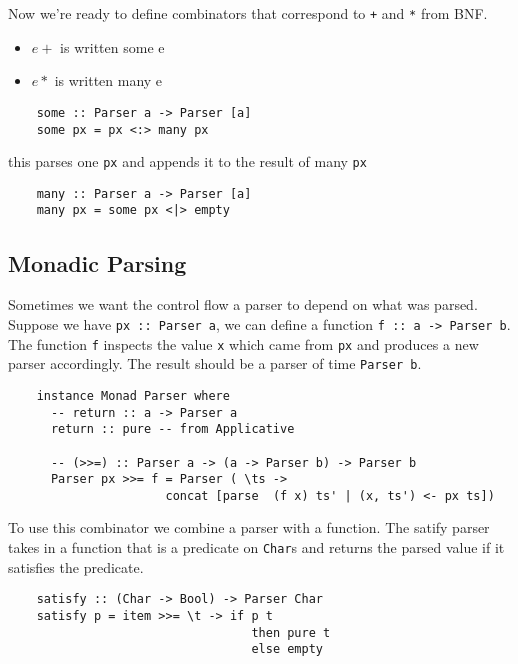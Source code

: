 \documentclass[a4paper,12pt]{article}
\theoremstyle{remark}
\begin{document}
Now we're ready to define combinators that correspond to \lstinline{+} and \lstinline{*} from BNF.
\begin{itemize}
  \item $e+$ is written some e
  \item $e*$ is written many e
\end{itemize}

\begin{lstlisting}
    some :: Parser a -> Parser [a]
    some px = px <:> many px  \end{lstlisting}

this parses one \lstinline{px} and appends it to the result of many \lstinline{px}

\begin{lstlisting}
    many :: Parser a -> Parser [a]
    many px = some px <|> empty  \end{lstlisting}

\subsection{Monadic Parsing}

Sometimes we want the control flow a parser to depend on what was parsed. Suppose
we have \lstinline{px :: Parser a}, we can define a function \lstinline{f :: a -> Parser b}. The function
\lstinline{f} inspects the value \lstinline{x} which came from \lstinline{px} and produces a new parser accordingly.
The result should be a parser of time \lstinline{Parser b}.

\begin{lstlisting}
    instance Monad Parser where
      -- return :: a -> Parser a
      return :: pure -- from Applicative

      -- (>>=) :: Parser a -> (a -> Parser b) -> Parser b
      Parser px >>= f = Parser ( \ts ->
                      concat [parse  (f x) ts' | (x, ts') <- px ts])  \end{lstlisting}

\begin{figure}[H]
  \centering
\end{figure}

To use this combinator we combine a parser with a function. The satify parser takes
in a function that is a predicate on \lstinline{Char}s and returns the parsed value if it
satisfies the predicate.

\begin{lstlisting}
    satisfy :: (Char -> Bool) -> Parser Char
    satisfy p = item >>= \t -> if p t
                                  then pure t
                                  else empty  \end{lstlisting}
\end{document}
